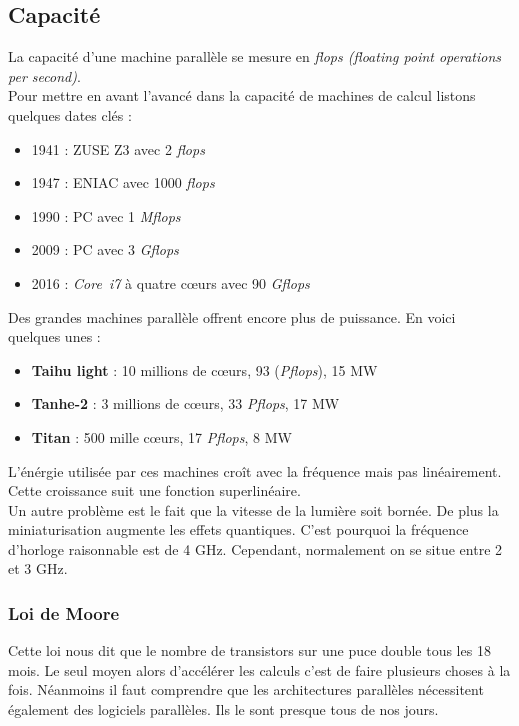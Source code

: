 \documentclass[12pt, a4paper]{article}
\begin{document}
    \subsection{Capacité}
      La capacité d'une machine parallèle se mesure en \textit{flops (floating
      point operations per second)}. \\
      Pour mettre en avant l'avancé dans la capacité de machines de calcul
      listons
      quelques dates clés :
      \begin{itemize}
        \item 1941 : ZUSE Z3 avec 2 \textit{flops}
        \item 1947 : ENIAC avec 1000 \textit{flops}
        \item 1990 : PC avec 1 \textit{Mflops}
        \item 2009 : PC avec 3 \textit{Gflops}
        \item 2016 : \textit{Core\texttrademark\ i7} à quatre c\oe urs avec 90
        \textit{Gflops}
      \end{itemize}
      Des grandes machines parallèle offrent encore plus de puissance. En voici
      quelques unes :
      \begin{itemize}
        \item \textbf{Taihu light} : 10 millions de c\oe urs, 93
        (\textit{Pflops}), 15 MW
        \item \textbf{Tanhe-2} : 3 millions de c\oe urs, 33 \textit{Pflops},
        17 MW
        \item \textbf{Titan} : 500 mille c\oe urs, 17 \textit{Pflops}, 8 MW
      \end{itemize}
      L'énérgie utilisée par ces machines croît avec la fréquence mais pas
      linéairement. Cette croissance suit une fonction superlinéaire. \\
      Un autre problème est le fait que la vitesse de la lumière soit bornée. De
      plus la miniaturisation augmente les effets quantiques. C'est pourquoi la
      fréquence d'horloge raisonnable est de 4 GHz. Cependant, normalement on
      se situe entre 2 et 3 GHz.
    \subsubsection{Loi de Moore}
      Cette loi nous dit que le nombre de transistors sur une puce double tous
      les 18 mois. Le seul moyen alors d'accélérer les calculs c'est de faire
      plusieurs choses à la fois. Néanmoins il faut comprendre que les
      architectures parallèles nécessitent également des logiciels parallèles.
      Ils le sont presque tous de nos jours.
\end{document}
